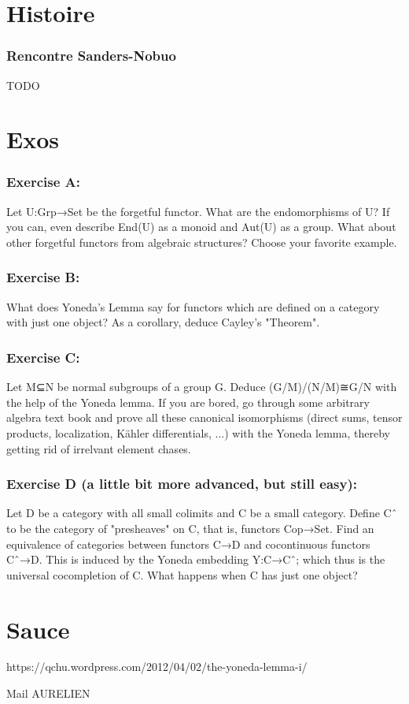 \documentclass[12pt,makeidx, draft]{amsart}
\begin{document}
\part{Histoire}

\section{Rencontre Sanders-Nobuo}
TODO

\part{Exos}
\section{Exercise A:} Let U:Grp→Set be the forgetful functor. What are the endomorphisms of U? If you can, even describe End(U) as a monoid and Aut(U) as a group. What about other forgetful functors from algebraic structures? Choose your favorite example. 

\section{Exercise B:} What does Yoneda's Lemma say for functors which are defined on a category with just one object? As a corollary, deduce Cayley's "Theorem". 

\section{Exercise C:} Let M⊆N be normal subgroups of a group G. Deduce (G/M)/(N/M)≅G/N with the help of the Yoneda lemma. If you are bored, go through some arbitrary algebra text book and prove all these canonical isomorphisms (direct sums, tensor products, localization, Kähler differentials, ...) with the Yoneda lemma, thereby getting rid of irrelvant element chases. 

\section{Exercise D (a little bit more advanced, but still easy):} Let D be a category with all small colimits and C be a small category. Define Cˆ to be the category of "presheaves" on C, that is, functors Cop→Set. Find an equivalence of categories between functors C→D and cocontinuous functors Cˆ→D. This is induced by the Yoneda embedding Y:C→Cˆ; which thus is the universal cocompletion of C. What happens when C has just one object? 

\part{Sauce}
https://qchu.wordpress.com/2012/04/02/the-yoneda-lemma-i/


Mail AURELIEN
\end{document}
